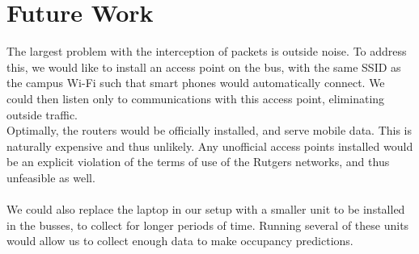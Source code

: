 \documentclass[letterpaper,english]{scrartcl}
\begin{document}
\section*{Future Work}
The largest problem with the interception of packets is outside noise.
To address this, we would like to install an access point on the bus, with the same SSID as the campus Wi-Fi such that smart phones would automatically connect.
We could then listen only to communications with this access point, eliminating outside traffic.
\\
Optimally, the routers would be officially installed, and serve mobile data. This is naturally expensive and thus unlikely. Any unofficial access points installed would be an explicit violation of the terms of use of the Rutgers networks, and thus unfeasible as well.
\\
\\
We could also replace the laptop in our setup with a smaller unit to be installed in the busses, to collect for longer periods of time. Running several of these units would allow us to collect enough data to make occupancy predictions.
\end{document}
